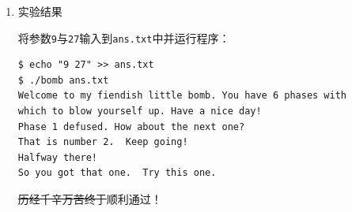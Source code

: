 \documentclass{paper}
\begin{document}
\begin{enumerate}
\begin{enumerate}
在\verb|main|函数中：
\begin{lstlisting}
int main(){
    for (int p1 = 0; p1 <= 14; ++p1){
        int ret = func4(p1, 0, 14);
        if (ret == 27){
            printf("p1 = %d, ret = %d\n", p1, ret);
            break;
        }
    }
    return 0;
}
\end{lstlisting}
将\verb|main|函数与\verb|func4|函数写入\verb|analyze_phase_4.c|，编译并运行：
\begin{lstlisting}
$ gcc analyze_phase_4.c -o main
$ ./main
p1 = 9, ret = 27
\end{lstlisting}
可以知道，输入的第一个参数为\verb|9|。

\end{enumerate}

\item 实验结果

将参数\verb|9|与\verb|27|输入到\verb|ans.txt|中并运行程序：
\begin{lstlisting}
$ echo "9 27" >> ans.txt
$ ./bomb ans.txt
Welcome to my fiendish little bomb. You have 6 phases with
which to blow yourself up. Have a nice day!
Phase 1 defused. How about the next one?
That is number 2.  Keep going!
Halfway there!
So you got that one.  Try this one.
\end{lstlisting}
\sout{历经千辛万苦终于}顺利通过！

\end{enumerate}
\end{document}
